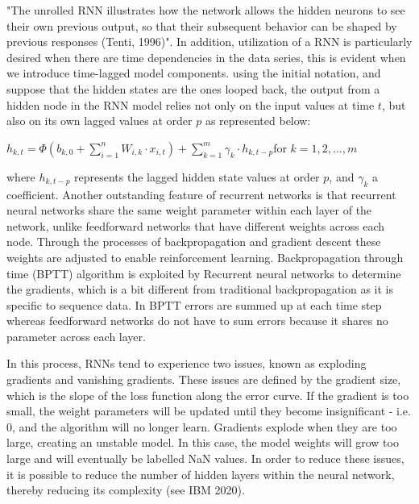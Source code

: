 \documentclass[a4paper,11pt,oneside]{book}
\begin{document}
"The unrolled RNN illustrates how the network allows the hidden neurons to see their
own previous output, so that their subsequent behavior can be shaped by previous
responses (Tenti, 1996)". In addition, utilization of a RNN is particularly desired when there are
time dependencies in the data series, this is evident when we introduce time-lagged model components.
using the initial notation, and suppose that the hidden states are the ones looped
back, the output from a hidden node in the RNN model relies not only on the input values at
time $t$, but also on its own lagged values at order $p$ as represented below:

\begin{center}
	$h_{k,t} =\Phi(b_{k,0} + \sum_{i=1}^{n} W_{i,k} \cdot x_{i,t}) + \sum_{k=1}^{m} \gamma_{k} \cdot h_{k,t-p}$for $k = 1,2,...,m$
\end{center}

where $h_{k,t-p}$ represents the lagged hidden state values at order $p$, and $\gamma_{k}$ a coefficient. Another outstanding feature of recurrent networks is that recurrent neural networks share the same weight parameter within each layer of the network, unlike feedforward networks that have different weights across each node. Through the processes of backpropagation and gradient descent these weights are adjusted to enable reinforcement learning.  Backpropagation through time (BPTT) algorithm is exploited by Recurrent neural networks to determine the gradients, which is a bit different from traditional backpropagation as it is specific to sequence data. In BPTT errors are summed up at each time step whereas feedforward networks do not have to sum errors because it shares no parameter across each layer.\newline\newline

In this process, RNNs tend to experience two issues, known as exploding gradients and vanishing gradients. These issues are defined by the gradient size, which is the slope of the loss function along the error curve. If the gradient is too small, the weight parameters will be updated until they become insignificant - i.e. 0, and the algorithm will no longer learn. Gradients explode when they are too large, creating an unstable model. In this case, the model weights will grow too large and will eventually be labelled NaN values. In order to reduce these issues, it is possible to reduce the number of hidden layers within the neural network, thereby reducing its complexity (see IBM 2020).
\end{document}
